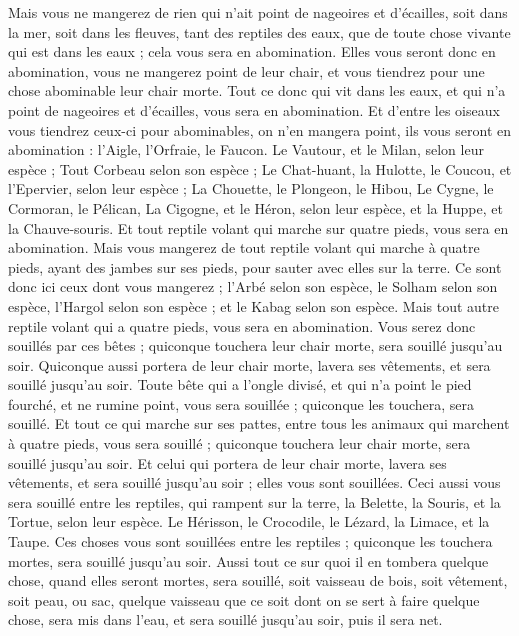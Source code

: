 \begin{multicols}{2}
Mais vous ne mangerez de rien qui n'ait point de nageoires et d'écailles, soit dans la mer, soit dans les fleuves, tant des reptiles des eaux, que de toute chose vivante qui est dans les eaux ; cela vous sera en abomination.
Elles vous seront donc en abomination, vous ne mangerez point de leur chair, et vous tiendrez pour une chose abominable leur chair morte.
Tout ce donc qui vit dans les eaux, et qui n'a point de nageoires et d'écailles, vous sera en abomination.
Et d'entre les oiseaux vous tiendrez ceux-ci pour abominables, on n'en mangera point, ils vous seront en abomination : l'Aigle, l'Orfraie, le Faucon.
Le Vautour, et le Milan, selon leur espèce ;
Tout Corbeau selon son espèce ;
Le Chat-huant, la Hulotte, le Coucou, et l'Epervier, selon leur espèce ;
La Chouette, le Plongeon, le Hibou,
Le Cygne, le Cormoran, le Pélican,
La Cigogne, et le Héron, selon leur espèce, et la Huppe, et la Chauve-souris.
Et tout reptile volant qui marche sur quatre pieds, vous sera en abomination.
Mais vous mangerez de tout reptile volant qui marche à quatre pieds, ayant des jambes sur ses pieds, pour sauter avec elles sur la terre.
Ce sont donc ici ceux dont vous mangerez ; l'Arbé selon son espèce, le Solham selon son espèce, l'Hargol selon son espèce ; et le Kabag selon son espèce.
Mais tout autre reptile volant qui a quatre pieds, vous sera en abomination.
Vous serez donc souillés par ces bêtes ; quiconque touchera leur chair morte, sera souillé jusqu'au soir.
Quiconque aussi portera de leur chair morte, lavera ses vêtements, et sera souillé jusqu'au soir.
Toute bête qui a l'ongle divisé, et qui n'a point le pied fourché, et ne rumine point, vous sera souillée ; quiconque les touchera, sera souillé.
Et tout ce qui marche sur ses pattes, entre tous les animaux qui marchent à quatre pieds, vous sera souillé ; quiconque touchera leur chair morte, sera souillé jusqu'au soir.
Et celui qui portera de leur chair morte, lavera ses vêtements, et sera souillé jusqu'au soir ; elles vous sont souillées.
Ceci aussi vous sera souillé entre les reptiles, qui rampent sur la terre, la Belette, la Souris, et la Tortue, selon leur espèce.
Le Hérisson, le Crocodile, le Lézard, la Limace, et la Taupe.
Ces choses vous sont souillées entre les reptiles ; quiconque les touchera mortes, sera souillé jusqu'au soir.
Aussi tout ce sur quoi il en tombera quelque chose, quand elles seront mortes, sera souillé, soit vaisseau de bois, soit vêtement, soit peau, ou sac, quelque vaisseau que ce soit dont on se sert à faire quelque chose, sera mis dans l'eau, et sera souillé jusqu'au soir, puis il sera net.

\end{multicols}
